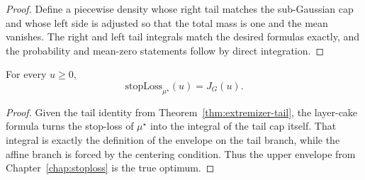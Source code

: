 \begin{proof}\leanok
Define a piecewise density whose right tail matches the sub-Gaussian cap
and whose left side is adjusted so that the total mass is one
and the mean vanishes. The right and left tail integrals match the desired
formulas exactly, and the probability and mean-zero statements follow by
direct integration.
\end{proof}

\begin{theorem}\label{thm:extremizer-stoploss}
\leanok
{}
For every $u \ge 0$,
\[
  \mathrm{stopLoss}_{\mu^\star}(u) = J_G(u).
\]
\end{theorem}

\begin{proof}\leanok
Given the tail identity from Theorem~\ref{thm:extremizer-tail}, the
layer-cake formula turns the stop-loss of $\mu^\star$ into the integral of the
tail cap itself. That integral is exactly the definition of the envelope on the
tail branch, while the affine branch is forced by the centering condition. Thus
the upper envelope from Chapter~\ref{chap:stoploss} is the true optimum.
\end{proof}
